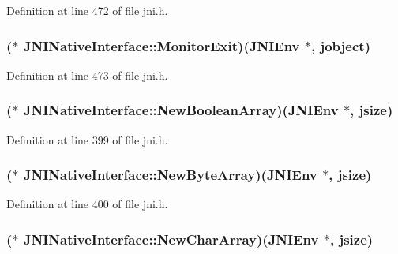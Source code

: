 Definition at line 472 of file jni.\-h.

\hypertarget{struct_j_n_i_native_interface_ac84eb2cf2591dbb09f5692a18dae9c49}{
\subsubsection[{Monitor\-Exit}]{($\ast$ J\-N\-I\-Native\-Interface\-::\-Monitor\-Exit)({\bf J\-N\-I\-Env} $\ast$, {\bf jobject})}}\label{struct_j_n_i_native_interface_ac84eb2cf2591dbb09f5692a18dae9c49}


Definition at line 473 of file jni.\-h.

\hypertarget{struct_j_n_i_native_interface_a407938be1551d3a12b0ef207bab4443c}{
\subsubsection[{New\-Boolean\-Array}]{($\ast$ J\-N\-I\-Native\-Interface\-::\-New\-Boolean\-Array)({\bf J\-N\-I\-Env} $\ast$, {\bf jsize})}}\label{struct_j_n_i_native_interface_a407938be1551d3a12b0ef207bab4443c}


Definition at line 399 of file jni.\-h.

\hypertarget{struct_j_n_i_native_interface_a16de2ae9d46ac81417c6075e116048b8}{
\subsubsection[{New\-Byte\-Array}]{($\ast$ J\-N\-I\-Native\-Interface\-::\-New\-Byte\-Array)({\bf J\-N\-I\-Env} $\ast$, {\bf jsize})}}\label{struct_j_n_i_native_interface_a16de2ae9d46ac81417c6075e116048b8}


Definition at line 400 of file jni.\-h.

\hypertarget{struct_j_n_i_native_interface_a542c4b59ee40771d43b19eefae0ddc28}{
\subsubsection[{New\-Char\-Array}]{($\ast$ J\-N\-I\-Native\-Interface\-::\-New\-Char\-Array)({\bf J\-N\-I\-Env} $\ast$, {\bf jsize})}}\label{struct_j_n_i_native_interface_a542c4b59ee40771d43b19eefae0ddc28}


